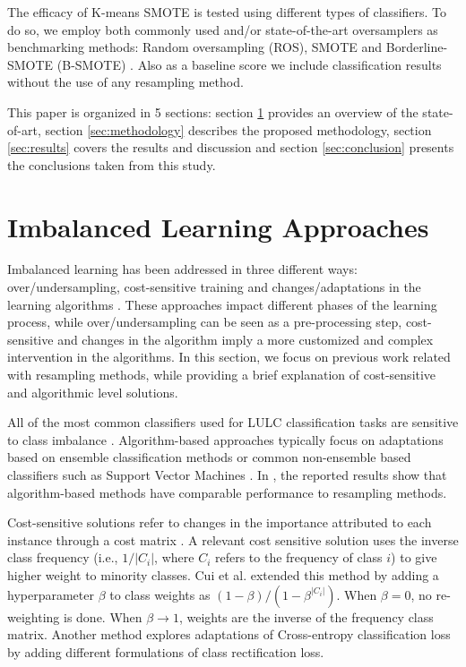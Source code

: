 \documentclass[information,article,submit,moreauthors,pdftex]{Definitions/mdpi}
\begin{document}
\begin{paracol}{2}
\linenumbers
\switchcolumn

The efficacy of K-means SMOTE is tested using different
types of classifiers. To do so, we employ both commonly used and/or
state-of-the-art oversamplers as benchmarking methods: Random oversampling
(ROS), SMOTE and Borderline-SMOTE (B-SMOTE) \citep{Han2005}. Also
as a baseline score we include classification results without the use of any
resampling method.

This paper is organized in 5 sections: section \ref{sec:sota} provides an
overview of the state-of-art, section \ref{sec:methodology} describes the
proposed methodology, section \ref{sec:results} covers the results and
discussion and section \ref{sec:conclusion} presents the conclusions taken from
this study.

\section{Imbalanced Learning Approaches} \label{sec:sota}

Imbalanced learning has been addressed in three different ways:
over/undersampling, cost-sensitive training and changes/adaptations in the
learning algorithms \citep{Kaur2019}. These approaches impact different
phases of the learning process, while over/undersampling can be seen as a
pre-processing step, cost-sensitive and changes in the algorithm imply a more
customized and complex intervention in the algorithms. In this
section, we focus on previous work related with resampling methods, while
providing a brief explanation of cost-sensitive and algorithmic level solutions.

All of the most common classifiers used for LULC classification tasks
\citep{Khatami2016, Gavade2019} are sensitive to class imbalance
\citep{Blagus2010}. Algorithm-based approaches typically focus on adaptations
based on ensemble classification methods \citep{Mellor2015} or common
non-ensemble based classifiers such as Support Vector Machines \citep{Shao2014}.
In \citep{Lee2016}, the reported results show that algorithm-based methods have
comparable performance to resampling methods.

Cost-sensitive solutions refer to changes in the importance attributed to each
instance through a cost matrix \citep{Huang2016,Cui2019,Dong2017}. A
relevant cost sensitive solution
\citep{Huang2016} uses  the inverse class frequency (i.e., $1/|C_i|$, where $C_i$ refers
to the frequency of class $i$) to give higher weight to
minority classes. Cui et al. \citep{Cui2019} extended this method by adding a
hyperparameter $\beta$ to class weights as $(1-\beta)/(1-\beta^{|C_i|})$. When
$\beta=0$, no re-weighting is done. When $\beta\rightarrow 1$, weights are the
inverse of the frequency class matrix. Another method \citep{Dong2017} explores
adaptations of Cross-entropy classification loss by adding different
formulations of class rectification loss.


\end{paracol}
\end{document}
